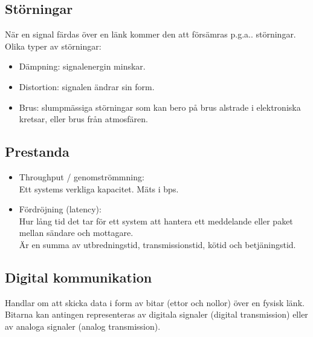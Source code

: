 \documentclass[11pt]{article}
\begin{document}
\subsection{Störningar}
När en signal färdas över en länk kommer den att försämras p.g.a.. störningar. \\
Olika typer av störningar:
\begin{itemize}
\item{Dämpning: signalenergin minskar.}
\item{Distortion: signalen ändrar sin form.}
\item{Brus: slumpmässiga störningar som kan bero på brus alstrade i elektroniska kretsar, eller brus från atmosfären.}
\end{itemize}
\subsection{Prestanda}
\begin{itemize}
\item{Throughput / genomströmmning: \\
	Ett systems verkliga kapacitet. Mäts i bps.}
\item{Fördröjning (latency): \\
	Hur lång tid det tar för ett system att hantera ett meddelande eller paket mellan sändare och mottagare. \\
	Är en summa av utbredningstid, transmissionstid, kötid och betjäningstid.}
\end{itemize}
\subsection{Digital kommunikation}
Handlar om att skicka data i form av bitar (ettor och nollor) över en fysisk länk. Bitarna kan antingen representeras av digitala signaler (digital transmission) eller av analoga signaler (analog transmission).
\end{document}

